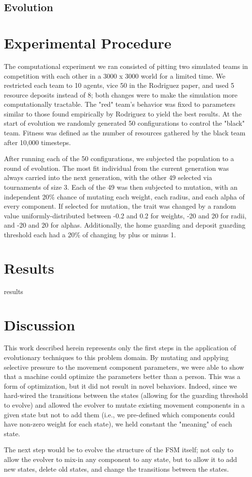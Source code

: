 \documentclass[12pt,journal,compsoc]{IEEEtran}
\begin{document}
\subsection{Evolution}

\section{Experimental Procedure}

The computational experiment we ran consisted of pitting two simulated teams in competition with each other in a 3000 x 3000 world for a limited time. We restricted each team to 10 agents, vice 50 in the Rodriguez paper, and used 5 resource deposits instead of 8; both changes were to make the simulation more computationally tractable. The "red" team's behavior was fixed to parameters similar to those found empirically by Rodriguez to yield the best results. At the start of evolution we randomly generated 50 configurations to control the "black" team. Fitness was defined as the number of resources gathered by the black team after 10,000 timesteps.

After running each of the 50 configurations, we subjected the population to a round of evolution. The most fit individual from the current generation was always carried into the next generation, with the other 49 selected via tournaments of size 3. Each of the 49 was then subjected to mutation, with an independent 20\% chance of mutating each weight, each radius, and each alpha of every component. If selected for mutation, the trait was changed by a random value uniformly-distributed between -0.2 and 0.2 for weights, -20 and 20 for radii, and -20 and 20 for alphas. Additionally, the home guarding and deposit guarding threshold each had a 20\% of changing by plus or minus 1.

\section{Results}
results

\section{Discussion}
This work described herein represents only the first steps in the application of evolutionary techniques to this problem domain. By mutating and applying selective pressure to the movement component parameters, we were able to show that a machine could optimize the parameters better than a person. This was a form of optimization, but it did not result in novel behaviors. Indeed, since we hard-wired the transitions between the states (allowing for the guarding threshold to evolve) and allowed the evolver to mutate existing movement components in a given state but not to add them (i.e., we pre-defined which components could have non-zero weight for each state), we held constant the "meaning" of each state.

The next step would be to evolve the structure of the FSM itself; not only to allow the evolver to mix-in any component to any state, but to allow it to add new states, delete old states, and change the transitions between the states.



\end{document}
